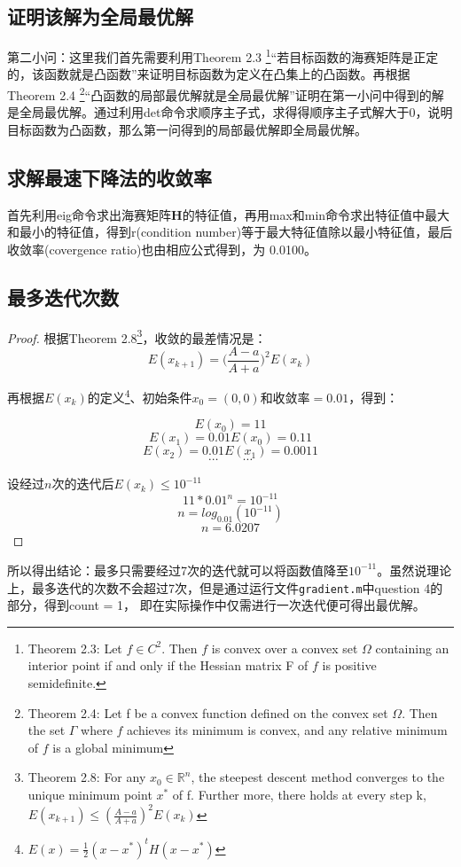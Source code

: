 \documentclass[a4paper, 12pt]{ctexart}  %
\begin{document}
\subsection{证明该解为全局最优解}
第二小问：这里我们首先需要利用Theorem 2.3 \footnote{Theorem 2.3: Let $f\in C^2$. Then $f$ is convex over a convex set $\Omega$ containing an interior point if and only if the Hessian matrix F of $f$ is positive semidefinite.}“若目标函数的海赛矩阵是正定的，该函数就是凸函数”来证明目标函数为定义在凸集上的凸函数。再根据Theorem 2.4 \footnote{Theorem 2.4: Let f be a convex function defined on the convex set $\Omega$. Then the set $\Gamma$ where $f$ achieves its minimum is convex, and any relative minimum of $f$ is a global minimum}“凸函数的局部最优解就是全局最优解”证明在第一小问中得到的解是全局最优解。通过利用det命令求顺序主子式，求得得顺序主子式解大于0，说明目标函数为凸函数，那么第一问得到的局部最优解即全局最优解。

\subsection{求解最速下降法的收敛率}
首先利用eig命令求出海赛矩阵\textbf{H}的特征值，再用max和min命令求出特征值中最大和最小的特征值，得到r(condition number)等于最大特征值除以最小特征值，最后收敛率(covergence ratio)也由相应公式得到，为 0.0100。

\subsection{最多迭代次数}
\begin{proof}
根据Theorem 2.8\footnote{Theorem 2.8: For any $x_{0}\in \mathbb{R}^n$, the steepest descent method converges to the unique minimum point $x^*$ of f. Further more, there holds at every step k, $E(x_{k+1})\leq ( \frac{A-a}{A+a} ) ^2 E(x_{k})$ }，收敛的最差情况是：\[E(x_{k+1}) = \bigg(\frac{A-a}{A+a}\bigg)^2 E(x_{k})\]

再根据$E(x_{k})$的定义\footnote{$E(x) = \frac{1}{2}(x-x^\ast)^t H (x-x^\ast)$}、初始条件$x_{0} = (0,0)$和收敛率$= 0.01$，得到：

\[E(x_{0}) =11\] 
\[E(x_{1}) =0.01E(x_{0}) = 0.11 \]
\[E(x_{2}) =0.01E(x_{1}) = 0.0011 \]
\[\cdots \qquad \cdots \]

设经过$n$次的迭代后$E(x_{k})\leq 10^{-11}$
 \[11*0.01^n=10^{-11} \]
 \[n = log_{0.01}(10^{-11}) \]
 \[n=6.0207\]
\end{proof}

所以得出结论：最多只需要经过7次的迭代就可以将函数值降至$10^{-11}$。虽然说理论上，最多迭代的次数不会超过7次，但是通过运行文件\verb|gradient.m|中question 4的部分，得到count = 1， 即在实际操作中仅需进行一次迭代便可得出最优解。
\end{document}
